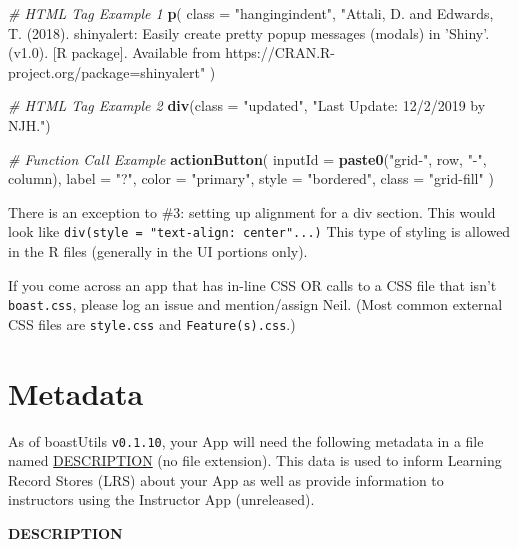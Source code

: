 \documentclass[
]{book}
\newenvironment{Shaded}{\begin{snugshade}}{\end{snugshade}}
\newcommand{\CommentTok}[1]{\textcolor[rgb]{0.56,0.35,0.01}{\textit{#1}}}
\newcommand{\DataTypeTok}[1]{\textcolor[rgb]{0.13,0.29,0.53}{#1}}
\newcommand{\KeywordTok}[1]{\textcolor[rgb]{0.13,0.29,0.53}{\textbf{#1}}}
\newcommand{\NormalTok}[1]{#1}
\newcommand{\StringTok}[1]{\textcolor[rgb]{0.31,0.60,0.02}{#1}}
\begin{document}
\begin{Shaded}
\begin{Highlighting}[]
\CommentTok{# HTML Tag Example 1}
\KeywordTok{p}\NormalTok{(}
  \DataTypeTok{class =} \StringTok{"hangingindent"}\NormalTok{,}
  \StringTok{"Attali, D. and Edwards, T. (2018). shinyalert: Easily create}
\StringTok{  pretty popup messages (modals) in 'Shiny'. (v1.0). [R package].}
\StringTok{  Available from https://CRAN.R-project.org/package=shinyalert"}
\NormalTok{)}

\CommentTok{# HTML Tag Example 2}
\KeywordTok{div}\NormalTok{(}\DataTypeTok{class =} \StringTok{"updated"}\NormalTok{, }\StringTok{"Last Update: 12/2/2019 by NJH."}\NormalTok{)}

\CommentTok{# Function Call Example}
\KeywordTok{actionButton}\NormalTok{(}
  \DataTypeTok{inputId =} \KeywordTok{paste0}\NormalTok{(}\StringTok{"grid-"}\NormalTok{, row, }\StringTok{"-"}\NormalTok{, column),}
  \DataTypeTok{label =} \StringTok{"?"}\NormalTok{,}
  \DataTypeTok{color =} \StringTok{"primary"}\NormalTok{,}
  \DataTypeTok{style =} \StringTok{"bordered"}\NormalTok{,}
  \DataTypeTok{class =} \StringTok{"grid-fill"}
\NormalTok{)}
\end{Highlighting}
\end{Shaded}

There is an exception to \#3: setting up alignment for a div section. This would look like \texttt{div(style\ =\ "text-align:\ center"...)} This type of styling is allowed in the R files (generally in the UI portions only).

If you come across an app that has in-line CSS OR calls to a CSS file that isn't \texttt{boast.css}, please log an issue and mention/assign Neil. (Most common external CSS files are \texttt{style.css} and \texttt{Feature(s).css}.)

\hypertarget{metadatac}{%
\section{Metadata}\label{metadatac}}

As of boastUtils \texttt{v0.1.10}, your App will need the following metadata in a file named \href{https://github.com/EducationShinyAppTeam/App_Template/blob/master/DESCRIPTION}{DESCRIPTION} (no file extension). This data is used to inform Learning Record Stores (LRS) about your App as well as provide information to instructors using the Instructor App (unreleased).

\textbf{DESCRIPTION}
\end{document}
